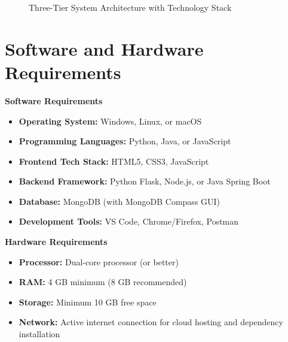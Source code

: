 \documentclass[12pt,a4paper]{report}
\begin{document}
\begin{figure}[h!]
\caption{Three-Tier System Architecture with Technology Stack}
\end{figure}

\section{Software and Hardware Requirements}

\textbf{Software Requirements}
\begin{itemize}
  \item \textbf{Operating System:} Windows, Linux, or macOS
  \item \textbf{Programming Languages:} Python, Java, or JavaScript
  \item \textbf{Frontend Tech Stack:} HTML5, CSS3, JavaScript
  \item \textbf{Backend Framework:} Python Flask, Node.js, or Java Spring Boot
  \item \textbf{Database:} MongoDB (with MongoDB Compass GUI)
  \item \textbf{Development Tools:} VS Code, Chrome/Firefox, Postman
\end{itemize}

\textbf{Hardware Requirements}
\begin{itemize}
  \item \textbf{Processor:} Dual-core processor (or better)
  \item \textbf{RAM:} 4 GB minimum (8 GB recommended)
  \item \textbf{Storage:} Minimum 10 GB free space
  \item \textbf{Network:} Active internet connection for cloud hosting and dependency installation
\end{itemize}
\end{document}
